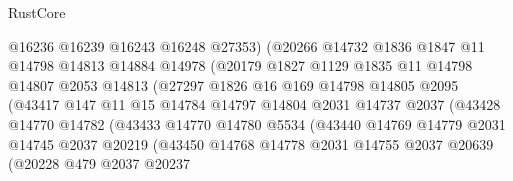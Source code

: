 \begin{lexlean}{RustCore}
\begin{coremodule}
                            @16236
                            @16239
                            @16243
                            @16248
                            @27353)
                          (@20266
                            @14732
                            @1836
                            @1847
                            @11
                            @14798
                            @14813
                            @14884
                            @14978
                            (@20179
                              @1827
                              @1129
                              @1835
                              @11
                              @14798
                              @14807
                              @2053
                              @14813
                              (@27297
                                @1826
                                @16
                                @169
                                @14798
                                @14805
                                @2095
                                (@43417
                                  @147
                                  @11
                                  @15
                                  @14784
                                  @14797
                                  @14804
                                  @2031
                                  @14737
                                  @2037
                                  (@43428
                                    @14770
                                    @14782
                                    (@43433
                                      @14770
                                      @14780
                                      @5534
                                      (@43440
                                        @14769
                                        @14779
                                        @2031
                                        @14745
                                        @2037
                                        @20219
                                        (@43450
                                          @14768
                                          @14778
                                          @2031
                                          @14755
                                          @2037
                                          @20639
                                          (@20228
                                            @479
                                            @2037
                                            @20237

\end{coremodule}
\end{lexlean}
